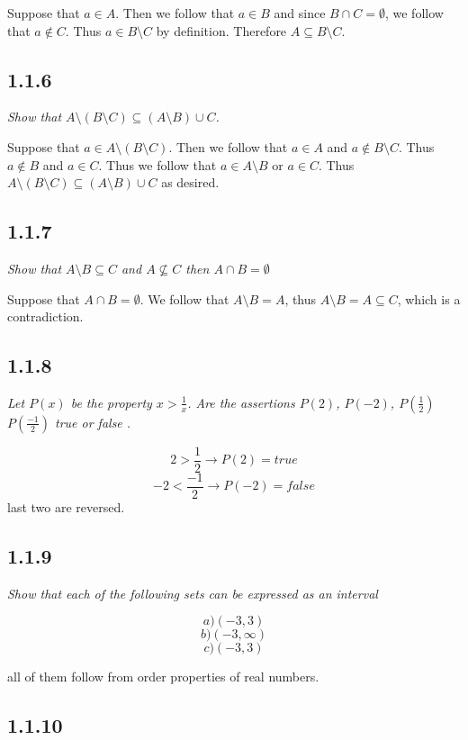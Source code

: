 \documentclass[11pt,oneside,titlepage]{book}
\begin{document}
Suppose that $a \in A$. Then we follow that $a \in B$ and since $B \cap C = \emptyset$, we
follow that $a \notin C$. Thus $a \in B \setminus C$ by definition. Therefore
$A \subseteq B \setminus C$.

\subsection*{1.1.6}

\textit{Show that $A \setminus (B \setminus C) \subseteq (A \setminus B) \cup C$.}

Suppose that $a \in A \setminus (B \setminus C)$. Then we follow that
$a \in A$ and $a \notin B \setminus C$. Thus $a \notin B$ and $a \in C$. Thus we
follow that $a \in A \setminus B$ or $a \in C$. Thus
$A \setminus (B \setminus C) \subseteq (A \setminus B) \cup C$
as desired.

\subsection*{1.1.7}

\textit{Show that $A \setminus B \subseteq C$ and $A \not \subseteq C$ then
  $A \cap B = \emptyset$}

Suppose that $A \cap B = \emptyset$. We follow that $A \setminus B = A$, thus
$A \setminus B = A \subseteq C$, which is a contradiction.

\subsection*{1.1.8}

\textit{Let $P(x)$ be the property $x > \frac 1 x$. Are the assertions $P(2)$, $P(-2)$,
  $P(\frac 1 2)$ $P( \frac{-1}{2})$ true or false .}

$$2 > \frac 1 2 \to P(2) = true$$
$$-2 < \frac{-1}{2} \to P(-2) = false$$
last two are reversed.

\subsection*{1.1.9}

\textit{Show that each of the following sets can be expressed as an interval}

$$a) (-3, 3)$$
$$b) (-3, \infty)$$
$$c) (-3, 3)$$

all of them follow from order properties of real numbers.

\subsection*{1.1.10}
\end{document}
